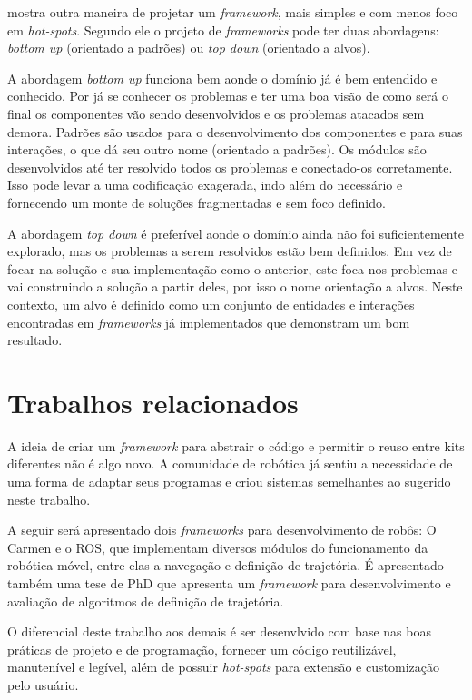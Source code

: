 \cite{Szyperski2002} mostra outra maneira de projetar um \textit{framework}, mais simples e com menos foco em \textit{hot-spots}. Segundo ele o projeto de \textit{frameworks} pode ter duas abordagens: \textit{bottom up} (orientado a padrões) ou \textit{top down} (orientado a alvos).

A abordagem \textit{bottom up} funciona bem aonde o domínio já é bem entendido e conhecido. Por já se conhecer os problemas e ter uma boa visão de como será o final os componentes vão sendo desenvolvidos e os problemas atacados sem demora. Padrões são usados para o desenvolvimento dos componentes e para suas interações, o que dá seu outro nome (orientado a padrões). Os módulos são desenvolvidos até ter resolvido todos os problemas e conectado-os corretamente. Isso pode levar a uma codificação exagerada, indo além do necessário e fornecendo um monte de soluções fragmentadas e sem foco definido.

A abordagem \textit{top down} é preferível aonde o domínio ainda não foi suficientemente explorado, mas os problemas a serem resolvidos estão bem definidos. Em vez de focar na solução e sua implementação como o anterior, este foca nos problemas e vai construindo a solução a partir deles, por isso o nome orientação a alvos. Neste contexto, um alvo é definido como um conjunto de entidades e interações encontradas em \textit{frameworks} já implementados que demonstram um bom resultado.

\section{Trabalhos relacionados}

A ideia de criar um \textit{framework} para abstrair o código e permitir o reuso entre kits diferentes não é algo novo. A comunidade de robótica já sentiu a necessidade de uma forma de adaptar seus programas e criou sistemas semelhantes ao sugerido neste trabalho.

A seguir será apresentado dois \textit{frameworks} para desenvolvimento de robôs: O Carmen e o ROS, que implementam diversos módulos do funcionamento da robótica móvel, entre elas a navegação e definição de trajetória. É apresentado também uma tese de PhD que apresenta um \textit{framework} para desenvolvimento e avaliação de algoritmos de definição de trajetória.

O diferencial deste trabalho aos demais é ser desenvlvido com base nas boas práticas de projeto e de programação, fornecer um código reutilizável, manutenível e legível, além de possuir \textit{hot-spots} para extensão e customização pelo usuário.

